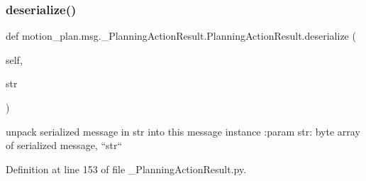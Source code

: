 \subsubsection{\texorpdfstring{deserialize()}{deserialize()}}
{\footnotesize\ttfamily def motion\+\_\+plan.\+msg.\+\_\+\+Planning\+Action\+Result.\+Planning\+Action\+Result.\+deserialize (\begin{DoxyParamCaption}\item[{}]{self,  }\item[{}]{str }\end{DoxyParamCaption})}

\begin{DoxyVerb}unpack serialized message in str into this message instance
:param str: byte array of serialized message, ``str``
\end{DoxyVerb}
 

Definition at line 153 of file \+\_\+\+Planning\+Action\+Result.\+py.



